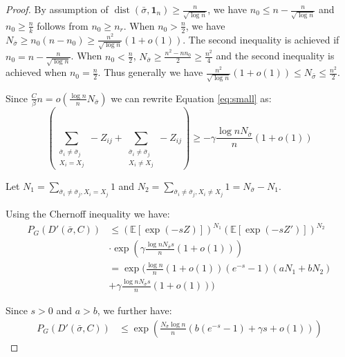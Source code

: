 \documentclass[entropy,article,accept,moreauthors,pdftex]{Definitions/mdpi}
\newcommand{\1}{\mathbbm{1}}
\DeclareMathOperator{\Dist}{dist}
\begin{document}
\begin{paracol}{2}
\begin{proof}
	By assumption of $\Dist(\bar{\sigma}, \mathbf{1}_n) \geq \frac{n}{\sqrt{\log n}}$, we have $n_0 \leq n - \frac{n}{\sqrt{\log n}}$
	and $n_0 \geq \frac{n}{k}$ follows from $n_0 \geq n_r$.
	When $n_0 > \frac{n}{2}$,
	we have $N_{\bar{\sigma}} \geq n_0 (n - n_0) \geq \frac{n^2}{\sqrt{\log n}}(1+o(1))$.
	The second inequality is achieved if $n_0 = n - \frac{n}{\sqrt{\log n}}$.
	When $n_0 < \frac{n}{2}$,
	$N_{\bar{\sigma}} \geq \frac{n^2 - nn_0}{2} \geq \frac{n^2}{4}$ and the second inequality is achieved when $n_0 = \frac{n}{2}$.
	Thus generally we have $\frac{n^2}{\sqrt{\log n}}(1+o(1)) \leq N_{\bar{\sigma}} \leq \frac{n^2}{2}$.
	
	Since $\frac{C}{\beta} n = o(\frac{\log n}{n} N_{\bar{\sigma}})$ we can rewrite Equation \eqref{eq:small} as:
\begin{equation}
	\left( \sum_{\substack{\bar{\sigma}_i  \neq \bar{\sigma}_j \\ X_i = X_j}} -Z_{ij}
	+ \sum_{\substack{\bar{\sigma}_i  \neq \bar{\sigma}_j \\ X_i \neq X_j}} -Z_{ij} \right)\geq -\gamma\frac{\log n N_{\bar{\sigma}}}{n}(1+o(1))
	\end{equation}
	
	Let $N_1 = \sum_{\bar{\sigma}_i  \neq \bar{\sigma}_j, X_i = X_j} 1$
	and $N_2 = \sum_{\bar{\sigma}_i  \neq \bar{\sigma}_j, X_i \neq X_j} 1 = N_{\bar{\sigma}} - N_1$.
	
	Using the Chernoff inequality we have:
	\begin{align*}
	P_G(D'(\bar{\sigma}, C))&
	\leq (\mathbb{E}[\exp(-s Z )])^{N_1} (\mathbb{E}[\exp(-s Z' )])^{N_2} \\
	&\cdot \exp(\gamma \frac{\log n N_{\bar{\sigma}} s}{n}(1+o(1))) \\
	&= \exp \Big( \frac{\log n}{n}(1+o(1))(e^{-s}-1)(aN_1 + bN_2) \\
	&+\gamma \frac{\log n N_{\bar{\sigma}} s}{n}(1+o(1))\Big)
	\end{align*}
	
	Since $s > 0$ and $a>b$, we further have:
	\begin{align*}
	P_G(D'(\bar{\sigma}, C))
	& \leq \exp( \frac{N_{\bar{\sigma}}\log n }{n}(b(e^{-s}-1)+ \gamma s + o(1))) 
	\end{align*}
	

\end{proof}
\end{paracol}
\end{document}
